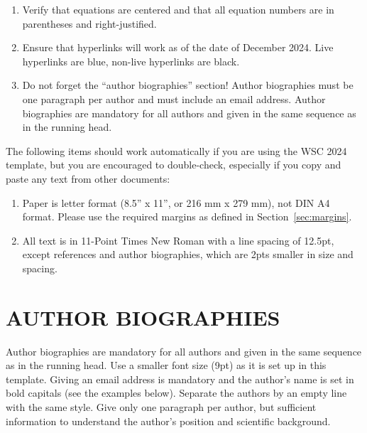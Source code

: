 \documentclass{wscpaperproc}
\theoremstyle{wsc}
\begin{document}
\begin{enumerate}
\item Verify that equations are centered and that all equation numbers are in parentheses and right-justified.
\item Ensure that hyperlinks will work as of the date of December 2024. Live hyperlinks are blue, non-live hyperlinks are black.
\item	Do not forget the ``author biographies'' section! Author biographies must be one paragraph per author and must include an email address. Author biographies are mandatory for all authors and given in the same sequence as in the running head.
\end{enumerate}

The following items should work automatically if you are using the WSC 2024 template, but you are encouraged to double-check, especially if you copy and paste any text from other documents:

\begin{enumerate}
\item Paper is letter format (8.5'' x 11'', or 216 mm x 279 mm), not DIN A4 format. Please use the required margins as defined in Section~\ref{sec:margins}.
\item All text is in 11-Point Times New Roman with a line spacing of 12.5pt, except references and author biographies, which are 2pts smaller in size and spacing.
\end{enumerate}

\footnotesize






\section*{AUTHOR BIOGRAPHIES}

{\normalsize Author biographies are mandatory for all authors and given in the same sequence as in the running head. Use a smaller font size (9pt) as it is set up in this template. Giving an email address is mandatory and the author's name is set in bold capitals (see the examples below). Separate the authors by an empty line with the same style. Give only one paragraph per author, but sufficient information to understand the author's position and scientific background.}\\
\end{document}
